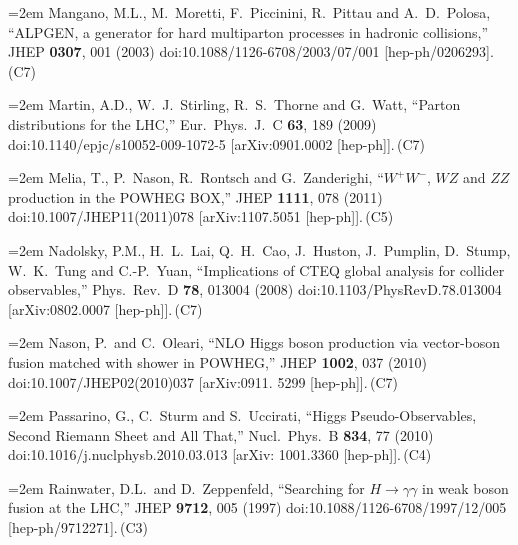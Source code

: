 \documentclass[letter,12pt]{article}
\def\xbibitem#1#2#3{\noindent\hangindent=2em #2\,(#3)}
\begin{document}
\xbibitem{Mangano:2002ea}{Mangano, M.L., M.~Moretti, F.~Piccinini, R.~Pittau and A.~D.~Polosa,
  ``ALPGEN, a generator for hard multiparton processes in hadronic collisions,''
  JHEP {\bf 0307}, 001 (2003)
  doi:10.1088/1126-6708/2003/07/001
  [hep-ph/0206293].}{C7}

\xbibitem{Martin:2009iq}{Martin, A.D., W.~J.~Stirling, R.~S.~Thorne and G.~Watt,
  ``Parton distributions for the LHC,''
  Eur.\ Phys.\ J.\ C {\bf 63}, 189 (2009)
  doi:10.1140/epjc/s10052-009-1072-5
  [arXiv:0901.0002 [hep-ph]].}{C7}
  
\xbibitem{Melia:2011tj}{Melia, T., P.~Nason, R.~Rontsch and G.~Zanderighi,
  ``$W^+W^-$, $WZ$ and $ZZ$ production in the POWHEG BOX,''
  JHEP {\bf 1111}, 078 (2011)
  doi:10.1007/JHEP11(2011)078
  [arXiv:1107.5051 [hep-ph]].}{C5}

\xbibitem{Nadolsky:2008zw}{Nadolsky, P.M., H.~L.~Lai, Q.~H.~Cao, J.~Huston, J.~Pumplin, D.~Stump, W.~K.~Tung and C.-P.~Yuan,
  ``Implications of CTEQ global analysis for collider observables,''
  Phys.\ Rev.\ D {\bf 78}, 013004 (2008)
  doi:10.1103/PhysRevD.78.013004
  [arXiv:0802.0007 [hep-ph]].}{C7}
  
\xbibitem{Nason:2009ai}{Nason, P.\ and C.~Oleari,
  ``NLO Higgs boson production via vector-boson fusion matched with shower in POWHEG,''
  JHEP {\bf 1002}, 037 (2010)
  doi:10.1007/JHEP02(2010)037
  [arXiv:0911. 5299 [hep-ph]].}{C7}
  
\xbibitem{Passarino:2010qk}{Passarino, G., C.~Sturm and S.~Uccirati,
  ``Higgs Pseudo-Observables, Second Riemann Sheet and All That,''
  Nucl.\ Phys.\ B {\bf 834}, 77 (2010)
  doi:10.1016/j.nuclphysb.2010.03.013
  [arXiv: 1001.3360 [hep-ph]].}{C4}
  
\xbibitem{Rainwater:1997dg}{Rainwater, D.L.\ and D.~Zeppenfeld,
  ``Searching for $H\to\gamma\gamma$ in weak boson fusion at the LHC,''
  JHEP {\bf 9712}, 005 (1997)
  doi:10.1088/1126-6708/1997/12/005
  [hep-ph/9712271].}{C3}
 
\end{document}
